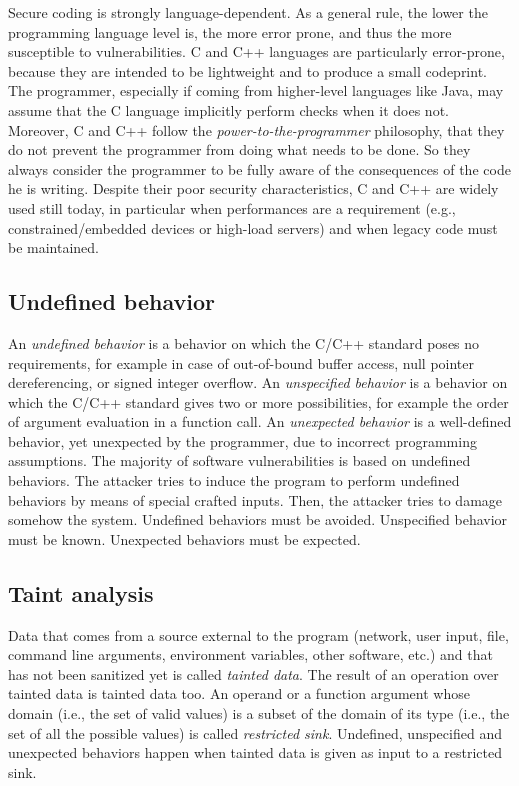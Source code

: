 \documentclass[a4paper,12pt]{article}
\begin{document}
Secure coding is strongly language-dependent. As a general rule, the lower the programming language level is, the more error prone, and thus the more susceptible to vulnerabilities. C and C++ languages are particularly error-prone, because they are intended to be lightweight and to produce a small codeprint. The programmer, especially if coming from higher-level languages like Java, may assume that the C language implicitly perform checks when it does not. Moreover, C and C++ follow the \textit{power-to-the-programmer} philosophy, that they do not prevent the programmer from doing what needs to be done. So they always consider the programmer to be fully aware of the consequences of the code he is writing. Despite their poor security characteristics, C and C++ are widely used still today, in particular when performances are a requirement (e.g., constrained/embedded devices or high-load servers) and when legacy code must be maintained.

\subsection{Undefined behavior}
An \textit{undefined behavior} is a behavior on which the C/C++ standard poses no requirements, for example in case of out-of-bound buffer access, null pointer dereferencing, or signed integer overflow. An \textit{unspecified behavior} is a behavior on which the C/C++ standard gives two or more possibilities, for example the order of argument evaluation in a function call. An \textit{unexpected behavior} is a well-defined behavior, yet unexpected by the programmer, due to incorrect programming assumptions. The majority of software vulnerabilities is based on undefined behaviors. The attacker tries to induce the program to perform undefined behaviors by means of special crafted inputs. Then, the attacker tries to damage somehow the system. Undefined behaviors must be avoided. Unspecified behavior must be known. Unexpected behaviors must be expected.

\subsection{Taint analysis}
Data that comes from a source external to the program (network, user input, file, command line arguments, environment variables, other software, etc.) and that has not been sanitized yet is called \textit{tainted data}. The result of an operation over tainted data is tainted data too. An operand or a function argument whose domain (i.e., the set of valid values) is a subset of the domain of its type (i.e., the set of all the possible values) is called \textit{restricted sink}. Undefined, unspecified and unexpected behaviors happen when tainted data is given as input to a restricted sink.
\end{document}
